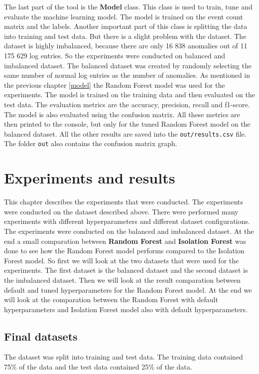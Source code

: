 The last part of the tool is the \textbf{Model} class. This class is used to train, tune and evaluate the machine learning model. The model is trained on the event count matrix and the labels.
Another important part of this class is splitting the data into training and test data.
But there is a slight problem with the dataset. The dataset is highly imbalanced, because there are only 16 838 anomalies out of 11 175 629 log entries.
So the experiments were conducted on balanced and imbalanced dataset. The balanced dataset was created by randomly selecting the same number of normal log entries as the number of anomalies.
As mentioned in the previous chapter \ref{model} the Random Forest model was used for the experiments. The model is trained on the training data and then evaluated on the test data.
The evaluation metrics are the accuracy, precision, recall and f1-score. The model is also evaluated using the confusion matrix. All these metrics are then printed to the console, 
but only for the tuned Random Forest model on the balanced dataset. All the other results are saved into the \texttt{out/results.csv} file. The folder \texttt{out} 
also contains the confusion matrix graph.

\chapter{Experiments and results}

This chapter describes the experiments that were conducted. The experiments were conducted on the dataset described above.
There were performed many experiments with different hyperparameters and different dataset configurations. The experiments were conducted on the balanced and imbalanced dataset.
At the end a small comparation between \textbf{Random Forest} and \textbf{Isolation Forest} was done to see how the Random Forest model performs compared to the Isolation Forest model.
So first we will look at the two datasets that were used for the experiments. The first dataset is the balanced dataset and the second dataset is the imbalanced dataset.
Then we will look at the result comparation between default and tuned hyperparameters for the Random Forest model. 
At the end we will look at the comparation between the Random Forest with default hyperparameters and Isolation Forest model also with default hyperparameters.

\section{Final datasets}
The dataset was split into training and test data. The training data contained 75\% of the data and the test data contained 25\% of the data.

